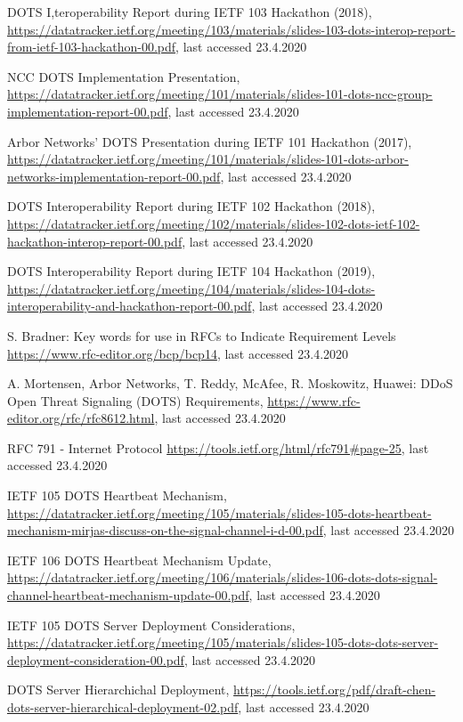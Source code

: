 \begin{thebibliography}{99}
 DOTS I,teroperability Report during IETF 103 Hackathon (2018), \url{https://datatracker.ietf.org/meeting/103/materials/slides-103-dots-interop-report-from-ietf-103-hackathon-00.pdf}, last accessed 23.4.2020

 NCC DOTS Implementation Presentation, \url{https://datatracker.ietf.org/meeting/101/materials/slides-101-dots-ncc-group-implementation-report-00.pdf}, last accessed 23.4.2020

 Arbor Networks' DOTS Presentation during IETF 101 Hackathon (2017), \url{https://datatracker.ietf.org/meeting/101/materials/slides-101-dots-arbor-networks-implementation-report-00.pdf}, last accessed 23.4.2020

 DOTS Interoperability Report during IETF 102 Hackathon (2018), \url{https://datatracker.ietf.org/meeting/102/materials/slides-102-dots-ietf-102-hackathon-interop-report-00.pdf}, last accessed 23.4.2020

 DOTS Interoperability Report during IETF 104 Hackathon (2019), \url{https://datatracker.ietf.org/meeting/104/materials/slides-104-dots-interoperability-and-hackathon-report-00.pdf}, last accessed 23.4.2020

 S. Bradner: Key words for use in RFCs to Indicate Requirement Levels \url{https://www.rfc-editor.org/bcp/bcp14}, last accessed 23.4.2020

 A. Mortensen, Arbor Networks, T. Reddy, McAfee, R. Moskowitz, Huawei: DDoS Open Threat Signaling (DOTS) Requirements, \url{https://www.rfc-editor.org/rfc/rfc8612.html}, last accessed 23.4.2020

 RFC 791 - Internet Protocol \url{https://tools.ietf.org/html/rfc791#page-25}, last accessed 23.4.2020

 IETF 105 DOTS Heartbeat Mechanism, \url{https://datatracker.ietf.org/meeting/105/materials/slides-105-dots-heartbeat-mechanism-mirjas-discuss-on-the-signal-channel-i-d-00.pdf}, last accessed 23.4.2020

 IETF 106 DOTS Heartbeat Mechanism Update, \url{https://datatracker.ietf.org/meeting/106/materials/slides-106-dots-dots-signal-channel-heartbeat-mechanism-update-00.pdf}, last accessed 23.4.2020

 IETF 105 DOTS Server Deployment Considerations, \url{https://datatracker.ietf.org/meeting/105/materials/slides-105-dots-dots-server-deployment-consideration-00.pdf}, last accessed 23.4.2020

 DOTS Server Hierarchichal Deployment, \url{https://tools.ietf.org/pdf/draft-chen-dots-server-hierarchical-deployment-02.pdf}, last accessed 23.4.2020

\end{thebibliography}